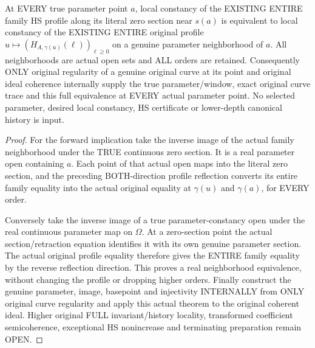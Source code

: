 \begin{theorem}
\label{hir:original-curve-translation-entire-hs-local-constancy}
\leanok
At EVERY true parameter point $a$, local constancy of the EXISTING ENTIRE
family HS profile along its literal zero section near $s(a)$ is equivalent
to local constancy of the EXISTING ENTIRE original profile
$u\mapsto(H_{A,\gamma(u)}(\ell))_{\ell\ge0}$ on a genuine parameter
neighborhood of $a$. All neighborhoods are actual open sets and ALL orders
are retained. Consequently ONLY original regularity of a genuine original
curve at its point and original ideal coherence internally supply the true
parameter/window, exact original curve trace and this full equivalence at
EVERY actual parameter point. No selected parameter, desired local
constancy, HS certificate or lower-depth canonical history is input.
\end{theorem}
\begin{proof}
For the forward implication take the inverse image of the actual family
neighborhood under the TRUE continuous zero section. It is a real parameter
open containing $a$. Each point of that actual open maps into the literal
zero section, and the preceding BOTH-direction profile reflection converts
its entire family equality into the actual original equality at
$\gamma(u)$ and $\gamma(a)$, for EVERY order.

Conversely take the inverse image of a true parameter-constancy open under
the real continuous parameter map on $\Omega$. At a zero-section point the
actual section/retraction equation identifies it with its own genuine
parameter section. The actual original profile equality therefore gives
the ENTIRE family equality by the reverse reflection direction. This proves
a real neighborhood equivalence, without changing the profile or dropping
higher orders. Finally construct the genuine parameter, image, basepoint
and injectivity INTERNALLY from ONLY original curve regularity and apply
this actual theorem to the original coherent ideal. Higher original FULL
invariant/history locality, transformed coefficient semicoherence,
exceptional HS nonincrease and terminating preparation remain OPEN.
\end{proof}
